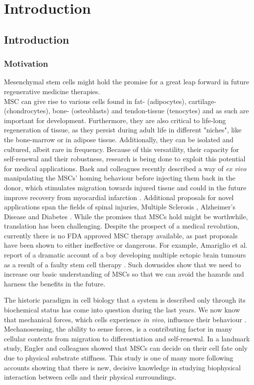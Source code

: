 
\chapter{Introduction}

\section{Introduction}
\subsection{Motivation}
\label{sec:motivation}
Mesenchymal stem cells might hold the promise for a great leap forward in future regenerative medicine therapies. \\
MSC can give rise to various cells found in fat- (adipocytes), cartilage- (chondrocytes), bone- (osteoblasts) and tendon-tissue (tenocytes) \cite{Barlow2008, Hass2011} and as such are important for development.
Furthermore, they are also critical to life-long regeneration of tissue, as they persist during adult life in different "niches", like the bone-marrow or in adipose tissue. Additionally, they can be isolated and cultured, albeit rare in frequency. Because of this versatility, their capacity for self-renewal and their robustness, research is being done to exploit this potential for medical applications. Baek and colleagues recently described a way of \textit{ex vivo} manipulating the MSCs' homing behaviour before injecting them back in the donor, which stimulates migration towards injured tissue and could in the future improve recovery from myocardial infarction \cite{Baek2011}.  Additional proposals for novel applications span the fields of spinal injuries\cite{Goldschlager2010}, Multiple Sclerosis \cite{Planchon2018}, Alzheimer's Disease \cite{Han2018, Hao2012} and Diabetes \cite{Evangelista2018}.  While the promises that MSCs hold might be worthwhile, translation has been challenging. Despite the prospect of a medical revolution, currently there is no FDA approved MSC therapy available, as past proposals have been shown to either ineffective or dangerous. For example, Amariglio et al. report of a dramatic account of a boy developing multiple ectopic brain tumours as a result of a faulty stem cell therapy \cite{Amariglio2009}. Such downsides show that we need to increase our basic understanding of MSCs so that we can avoid the hazards and harness the benefits in the future.\par

The historic paradigm in cell biology that a system is described only through its biochemical status has come into question during the last years. We now know that mechanical forces, which cells experience \textit{in vivo}, influence their behaviour \cite{Hao2015}. Mechanosensing, the ability to sense forces, is a contributing factor in many cellular contexts from migration to differentiation and self-renewal. In a landmark study, Engler and colleagues\cite{Engler2006} showed that MSCs can decide on their cell fate only due to physical substrate stiffness. This study is one of many more following accounts showing that there is new, decisive knowledge in studying biophysical interaction between cells and their physical surroundings.\par

